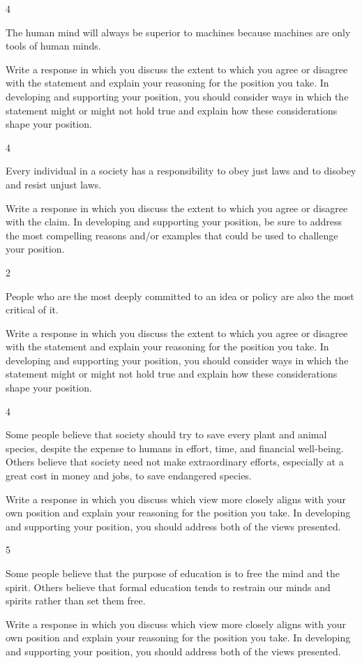 \documentclass[]{article}
\begin{document}
4

The human mind will always be superior to machines because machines are
only tools of human minds.

Write a response in which you discuss the extent to which you agree or
disagree with the statement and explain your reasoning for the position
you take. In developing and supporting your position, you should
consider ways in which the statement might or might not hold true and
explain how these considerations shape your position.

4

Every individual in a society has a responsibility to obey just laws and
to disobey and resist unjust laws.

Write a response in which you discuss the extent to which you agree or
disagree with the claim. In developing and supporting your position, be
sure to address the most compelling reasons and/or examples that could
be used to challenge your position.

2

People who are the most deeply committed to an idea or policy are also
the most critical of it.

Write a response in which you discuss the extent to which you agree or
disagree with the statement and explain your reasoning for the position
you take. In developing and supporting your position, you should
consider ways in which the statement might or might not hold true and
explain how these considerations shape your position.

4

Some people believe that society should try to save every plant and
animal species, despite the expense to humans in effort, time, and
financial well-being. Others believe that society need not make
extraordinary efforts, especially at a great cost in money and jobs, to
save endangered species.

Write a response in which you discuss which view more closely aligns
with your own position and explain your reasoning for the position you
take. In developing and supporting your position, you should address
both of the views presented.

5

Some people believe that the purpose of education is to free the mind
and the spirit. Others believe that formal education tends to restrain
our minds and spirits rather than set them free.

Write a response in which you discuss which view more closely aligns
with your own position and explain your reasoning for the position you
take. In developing and supporting your position, you should address
both of the views presented.
\end{document}
